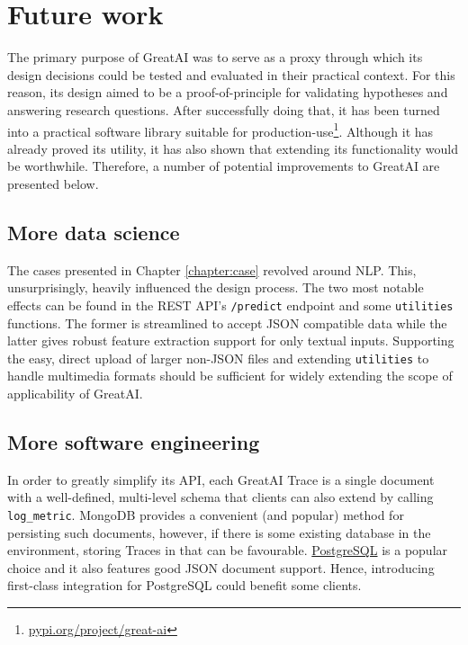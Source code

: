 \section{Future work} 

The primary purpose of GreatAI was to serve as a proxy through which its design decisions could be tested and evaluated in their practical context. For this reason, its design aimed to be a proof-of-principle for validating hypotheses and answering research questions. After successfully doing that, it has been turned into a practical software library suitable for production-use\footnote{\href{https://pypi.org/project/great-ai/}{pypi.org/project/great-ai}}. Although it has already proved its utility, it has also shown that extending its functionality would be worthwhile. Therefore, a number of potential improvements to GreatAI are presented below.
 
\subsection{More data science}

The cases presented in Chapter \ref{chapter:case} revolved around NLP. This, unsurprisingly, heavily influenced the design process. The two most notable effects can be found in the REST API's \texttt{/predict} endpoint and some \texttt{utilities} functions. The former is streamlined to accept JSON compatible data while the latter gives robust feature extraction support for only textual inputs. Supporting the easy, direct upload of larger non-JSON files and extending \texttt{utilities} to handle multimedia formats should be sufficient for widely extending the scope of applicability of GreatAI.

\subsection{More software engineering}

In order to greatly simplify its API, each GreatAI Trace is a single document with a well-defined, multi-level schema that clients can also extend by calling \texttt{log\_metric}. MongoDB provides a convenient (and popular) method for persisting such documents, however, if there is some existing database in the environment, storing Traces in that can be favourable. \href{https://www.postgresql.org/}{PostgreSQL} is a popular choice and it also features good JSON document support. Hence, introducing first-class integration for PostgreSQL could benefit some clients.

